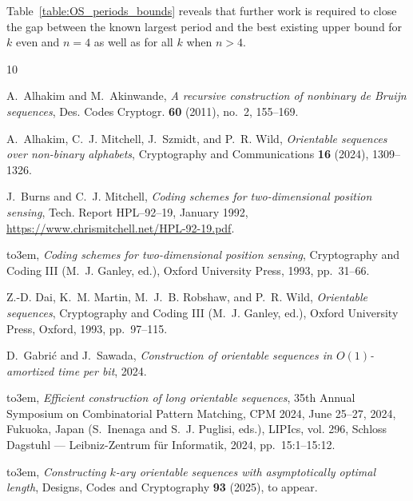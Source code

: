 \documentclass[a4paper,11pt]{article}
\begin{document}
Table~\ref{table:OS_periods_bounds} reveals that further work is required to close the gap between
the known largest period and the best existing upper bound for $k$ even and $n=4$ as well as for
all $k$ when $n>4$.


%
%
%

\providecommand{\bysame}{\leavevmode\hbox to3em{\hrulefill}\thinspace}
\providecommand{\MR}{\relax\ifhmode\unskip\space\fi MR }
\providecommand{\MRhref}[2]{%
  \href{http://www.ams.org/mathscinet-getitem?mr=#1}{#2}
} \providecommand{\href}[2]{#2}
\begin{thebibliography}{10}

 A.~Alhakim and M.~Akinwande, \emph{A recursive construction of nonbinary de
  {Bruijn} sequences}, Des. Codes Cryptogr. \textbf{60} (2011), no.~2,
  155--169.

 A.~Alhakim, C.~J. Mitchell, J.~Szmidt, and P.~R. Wild, \emph{Orientable
  sequences over non-binary alphabets}, Cryptography and Communications
  \textbf{16} (2024), 1309--1326.

 J.~Burns and C.~J. Mitchell, \emph{Coding schemes for two-dimensional position
  sensing}, Tech. Report HPL--92--19, January 1992,
  \url{https://www.chrismitchell.net/HPL-92-19.pdf}.

 \bysame, \emph{Coding schemes for two-dimensional position sensing},
  Cryptography and Coding III (M.~J. Ganley, ed.), Oxford University Press,
  1993, pp.~31--66.

 Z.-D. Dai, K.~M. Martin, M.~J.~B. Robshaw, and P.~R. Wild, \emph{Orientable
  sequences}, Cryptography and Coding III (M.~J. Ganley, ed.), Oxford
  University Press, Oxford, 1993, pp.~97--115.

 D.~Gabri{\'c} and J.~Sawada, \emph{Construction of orientable sequences in
  {$O(1)$-amortized} time per bit}, 2024.

 \bysame, \emph{Efficient construction of long orientable sequences}, 35th
  Annual Symposium on Combinatorial Pattern Matching, {CPM} 2024, June 25--27,
  2024, Fukuoka, Japan (S.~Inenaga and S.~J. Puglisi, eds.), LIPIcs, vol. 296,
  Schloss Dagstuhl --- Leibniz-Zentrum f{\"{u}}r Informatik, 2024,
  pp.~15:1--15:12.

 \bysame, \emph{Constructing $k$-ary orientable sequences with asymptotically
  optimal length}, Designs, Codes and Cryptography \textbf{93} (2025), to
  appear.


\end{thebibliography}
\end{document}

